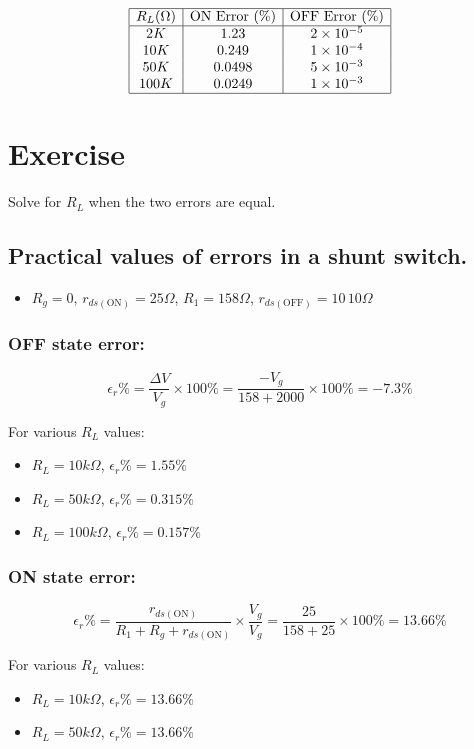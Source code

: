 \documentclass[a4paper,9pt,twoside,openany,twocolumn]{memoir}
\begin{document}
\[
\begin{array}{|c|c|c|}
\hline
R_L (\Omega) & \text{ON Error (\%)} & \text{OFF Error (\%)} \\
\hline
2K & 1.23 & 2 \times 10^{-5} \\
10K & 0.249 & 1 \times 10^{-4} \\
50K & 0.0498 & 5 \times 10^{-3} \\
100K & 0.0249 & 1 \times 10^{-3} \\
\hline
\end{array}
\]
\section*{Exercise}

Solve for $R_L$ when the two errors are equal.

\subsection*{Practical values of errors in a shunt switch.}

\begin{itemize}
    \item $R_g = 0$, $r_{ds(\text{ON})} = 25\Omega$, $R_1 = 158\Omega$, $r_{ds(\text{OFF})} = 10\,10\Omega$
\end{itemize}

\subsubsection*{OFF state error:}
\[
\epsilon_r \% = \frac{\Delta V}{V_g} \times 100\% = \frac{-V_g}{158 + 2000} \times 100\% = -7.3\%
\]

For various $R_L$ values:
\begin{itemize}
    \item $R_L = 10k\Omega$, $\epsilon_r \% = 1.55\%$
    \item $R_L = 50k\Omega$, $\epsilon_r \% = 0.315\%$
    \item $R_L = 100k\Omega$, $\epsilon_r \% = 0.157\%$
\end{itemize}

\subsubsection*{ON state error:}
\[
\epsilon_r \% = \frac{r_{ds(\text{ON})}}{R_1 + R_g + r_{ds(\text{ON})}} \times \frac{V_g}{V_g} = \frac{25}{158 + 25} \times 100\% = 13.66\%
\]

For various $R_L$ values:
\begin{itemize}
    \item $R_L = 10k\Omega$, $\epsilon_r \% = 13.66\%$
    \item $R_L = 50k\Omega$, $\epsilon_r \% = 13.66\%$
\end{itemize}
\end{document}
